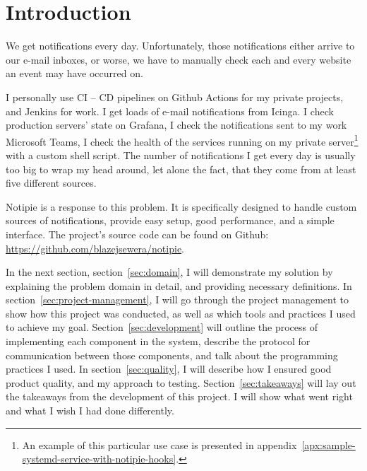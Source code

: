\section{Introduction}\label{sec:introduction}

We get notifications every day.
Unfortunately,
those notifications either arrive
to our e-mail inboxes,
or worse,
we have to manually check
each and every website an event may have occurred on.

I personally use \ac{CI} -- \ac{CD} pipelines
on Github Actions for my private projects,
and Jenkins for work.
I get loads of e-mail notifications from Icinga.
I check production servers' state on Grafana,
I check the notifications sent to my work Microsoft Teams,
I check the health of the services
running on my private server\footnote{
  An example of this particular use case
  is presented in appendix~\ref{apx:sample-systemd-service-with-notipie-hooks}.
} with a custom shell script.
The number of notifications I get every day
is usually too big to wrap my head around,
let alone the fact,
that they come from at least five different sources.

Notipie is a response to this problem.
It is specifically designed
to handle custom sources of notifications,
provide easy setup,
good performance,
and a simple interface.
The project's source code can be found
on Github: \url{https://github.com/blazejsewera/notipie}.

In the next section,
section~\ref{sec:domain},
I will demonstrate my solution
by explaining the problem domain in detail,
and providing necessary definitions.
In section~\ref{sec:project-management},
I will go through
the project management
to show how this project was conducted,
as well as which tools and practices
I used to achieve my goal.
Section~\ref{sec:development}
will outline the process of implementing
each component in the system,
describe the protocol for communication
between those components,
and talk about the programming practices I used.
In section~\ref{sec:quality},
I will describe how I ensured
good product quality,
and my approach to testing.
Section~\ref{sec:takeaways}
will lay out the takeaways from the development
of this project.
I will show what went right
and what I wish I had done differently.


